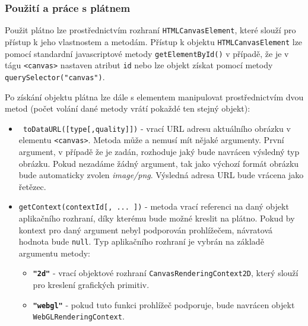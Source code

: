 \subsubsection*{Použití a práce s plátnem}
Použit plátno lze prostřednictvím rozhraní \texttt{HTMLCanvasElement}, které slouží pro přístup k jeho vlastnostem a metodám. Přístup k objektu \texttt{HTMLCanvasElement} lze pomocí standardní javascriptové metody \texttt{getElementById()} v případě, že je v tágu \texttt{<canvas>} nastaven atribut \texttt{id} nebo lze objekt získat pomocí metody \texttt{querySelector("canvas")}.

Po získání objektu plátna lze dále s elementem manipulovat prostřednictvím dvou metod (počet volání dané metody vrátí pokaždé ten stejný objekt):
	 	\begin{itemize}		
			\item \texttt{ toDataURL([type[,quality]])} \newline
			 - vrací URL adresu aktuálního obrázku v elementu \texttt{<canvas>}. Metoda může a nemusí mít nějaké argumenty. První argument, v případě že je zadán, rozhoduje jaký bude navrácen výsledný typ obrázku. Pokud nezadáme žádný argument, tak jako výchozí formát obrázku bude automaticky zvolen \textit{image/png}. Výsledná adresa URL bude vrácena jako řetězec. \cite{html5}
			
			\item \texttt{getContext(contextId[, ... ])}\newline
			 - metoda vrací referenci na daný objekt aplikačního rozhraní, díky kterému bude možné kreslit na plátno. Pokud by kontext pro daný argument nebyl podporován prohlížečem, návratová hodnota bude \texttt{null}. Typ aplikačního rozhraní je vybrán na základě argumentu metody:
			 \begin{itemize}
			 	\item  \texttt{\textbf{"2d"}} - vrací objektové rozhraní \texttt{CanvasRenderingContext2D}, který slouží pro kreslení grafických primitiv.
			 	
			 	\item \texttt{\textbf{"webgl"}} - pokud tuto funkci prohlížeč podporuje, bude navrácen objekt \newline \texttt{WebGLRenderingContext}. 
			 \end{itemize}
		 
 
		\end{itemize}

\newpage


